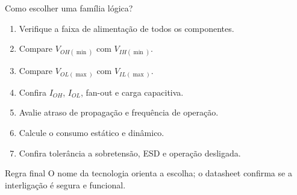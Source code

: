 \begin{frame}{Como escolher uma família lógica?}
    \begin{enumerate}
        \item Verifique a faixa de alimentação de todos os componentes.
        \item Compare $V_{OH(\min)}$ com $V_{IH(\min)}$.
        \item Compare $V_{OL(\max)}$ com $V_{IL(\max)}$.
        \item Confira $I_{OH}$, $I_{OL}$, fan-out e carga capacitiva.
        \item Avalie atraso de propagação e frequência de operação.
        \item Calcule o consumo estático e dinâmico.
        \item Confira tolerância a sobretensão, ESD e operação desligada.
    \end{enumerate}

    \begin{alertblock}{Regra final}
        O nome da tecnologia orienta a escolha; o datasheet confirma se a
        interligação é segura e funcional.
    \end{alertblock}
\end{frame}
